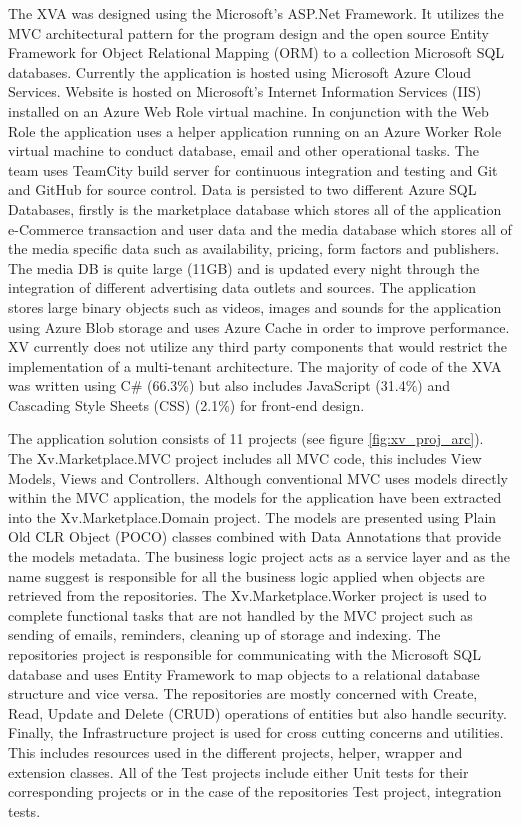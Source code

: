 The XVA was designed using the Microsoft's ASP.Net Framework. It utilizes the MVC architectural pattern for the program design and the open source Entity Framework for Object Relational Mapping (ORM) to a collection Microsoft SQL databases. Currently the application is hosted using Microsoft Azure Cloud Services. Website is hosted on Microsoft's Internet Information Services (IIS) installed on an Azure Web Role virtual machine. In conjunction with the Web Role the application uses a helper application running on an Azure Worker Role virtual machine to conduct database, email and other operational tasks. The team uses TeamCity build server for continuous integration and testing and Git and GitHub for source control. Data is persisted to two different Azure SQL Databases, firstly is the marketplace database which stores all of the application e-Commerce transaction and user data and the media database which stores all of the media specific data such as availability, pricing, form factors and publishers. The media DB is quite large (11GB) and is updated every night through the integration of different advertising data outlets and sources. The application stores large binary objects such as videos, images and sounds for the application using Azure Blob storage and uses Azure Cache in order to improve performance. XV currently does not utilize any third party components that would restrict the implementation of a multi-tenant architecture. The majority of code of the XVA was written using C\# (66.3\%) but also includes JavaScript (31.4\%) and Cascading Style Sheets (CSS) (2.1\%) for front-end design.



The application solution consists of 11 projects (see figure \ref{fig:xv_proj_arc}). The Xv.Marketplace.MVC project includes all MVC code, this includes View Models, Views and Controllers. Although conventional MVC uses models directly within the MVC application, the models for the application have been extracted into the Xv.Marketplace.Domain project. The models are presented using Plain Old CLR Object (POCO) classes combined with Data Annotations that provide the models metadata. The business logic project acts as a service layer and as the name suggest is responsible for all the business logic applied when objects are retrieved from the repositories. The Xv.Marketplace.Worker project is used to complete functional tasks that are not handled by the MVC project such as sending of emails, reminders, cleaning up of storage and indexing. The repositories project is responsible for communicating with the Microsoft SQL database and uses Entity Framework to map objects to a relational database structure and vice versa. The repositories are mostly concerned with Create, Read, Update and Delete (CRUD) operations of entities but also handle security. Finally, the Infrastructure project is used for cross cutting concerns and utilities. This includes resources used in the different projects, helper, wrapper and extension classes. All of the Test projects include either Unit tests for their corresponding projects or in the case of the repositories Test project, integration tests.


